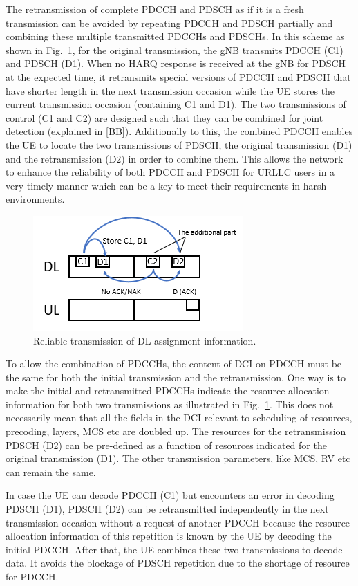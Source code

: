 \documentclass[conference,10pt]{IEEEtran}
\begin{document}
The retransmission of complete PDCCH and PDSCH as if it is a fresh transmission can be avoided by repeating PDCCH and PDSCH partially and combining these multiple transmitted PDCCHs and PDSCHs. In this scheme as shown in Fig.~\ref{fig1}, for the original transmission, the gNB transmits PDCCH (C1) and PDSCH (D1). When no HARQ response is received at the gNB for PDSCH at the expected time, it retransmits special versions of PDCCH and PDSCH that have shorter length in the next transmission occasion while the UE stores the current transmission occasion (containing C1 and D1). The two transmissions of control (C1 and C2) are designed such that they can be combined for joint detection (explained in \ref{BB}). Additionally to this, the combined PDCCH enables the UE to locate the two transmissions of PDSCH, the original transmission (D1) and the retransmission (D2) in order to combine them. This allows the network to enhance the reliability of both PDCCH and PDSCH for URLLC users in a very timely manner which can be a key to meet their requirements in harsh environments. 

\begin{figure}[htbp]
\centerline{\includegraphics[scale=0.6]{fig1.png}}
\caption{Reliable transmission of DL assignment information.}
\label{fig1}
\end{figure}

To allow the combination of PDCCHs, the content of DCI on PDCCH must be the same for both the initial transmission and the retransmission. One way is to make the initial and retransmitted PDCCHs indicate the resource allocation information for both two transmissions as illustrated in Fig.~\ref{fig1}. This does not necessarily mean that all the fields in the DCI relevant to scheduling of resources, precoding, layers, MCS etc are doubled up. The resources for the retransmission PDSCH (D2) can be pre-defined as a function of resources indicated for the original transmission (D1). The other transmission parameters, like MCS, RV etc can remain the same.

In case the UE can decode PDCCH (C1) but encounters an error in decoding PDSCH (D1), PDSCH (D2) can be retransmitted independently in the next transmission occasion without a request of another PDCCH because the resource allocation information of this repetition is known by the UE by decoding the initial PDCCH. After that, the UE combines these two transmissions to decode data. It avoids the blockage of PDSCH repetition due to the shortage of resource for PDCCH. 
\end{document}
